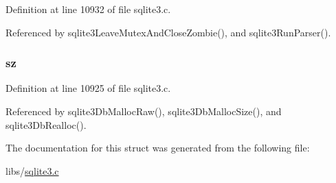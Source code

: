 Definition at line 10932 of file sqlite3.\+c.



Referenced by sqlite3\+Leave\+Mutex\+And\+Close\+Zombie(), and sqlite3\+Run\+Parser().

\hypertarget{struct_lookaside_a4e3ef9f118930ad5f278baeac3bac99b}{}
\subsubsection[{sz}]{ sz}\label{struct_lookaside_a4e3ef9f118930ad5f278baeac3bac99b}


Definition at line 10925 of file sqlite3.\+c.



Referenced by sqlite3\+Db\+Malloc\+Raw(), sqlite3\+Db\+Malloc\+Size(), and sqlite3\+Db\+Realloc().



The documentation for this struct was generated from the following file\+:\begin{DoxyCompactItemize}
\item 
libs/\hyperlink{sqlite3_8c}{sqlite3.\+c}\end{DoxyCompactItemize}
